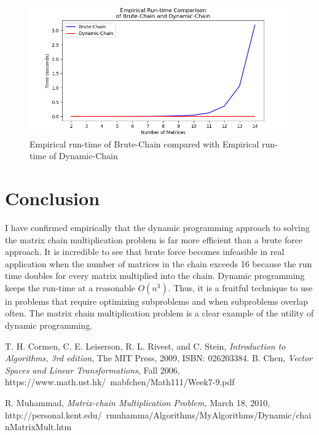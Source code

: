 \documentclass[letterpaper,titlepage]{article}
\begin{document}
\begin{figure}[h!]
    \includegraphics[scale=.8]{brute_vs_dynamic.png}  
    \caption{Empirical run-time of Brute-Chain compared with Empirical run-time of Dynamic-Chain}
    \label{fig:brute_vs_dynamic}
\end{figure}


\section{Conclusion}
I have confirmed empirically that the dynamic programming approach to solving the matrix chain multiplication problem is far more efficient than a brute force approach. It is incredible to see that brute force becomes infeasible in real application when the number of matrices in the chain exceeds 16 because the run time doubles for every matrix multiplied into the chain. Dynamic programming keeps the run-time at a reasonable $O(n^3)$. Thus, it is a fruitful technique to use in problems that require optimizing subproblems and when subproblems overlap often. The matrix chain multiplication problem is a clear example of the utility of dynamic programming.

\pagebreak

\begin{thebibliography}{1}
   T. H. Cormen, C. E. Leiserson, R. L. Rivest, and C. Stein, {\em Introduction to Algorithms, 3rd edition}, The MIT Press, 2009, ISBN: 026203384.
   B. Chen, {\em Vector Spaces and Linear Transformations}, Fall 2006, https://www.math.ust.hk/~mabfchen/Math111/Week7-9.pdf
  
   R. Muhammad, { \em Matrix-chain Multiplication Problem,} March 18, 2010, http://personal.kent.edu/~rmuhamma/Algorithms/MyAlgorithms/Dynamic/chainMatrixMult.htm
\end{thebibliography}
  
\end{document}

